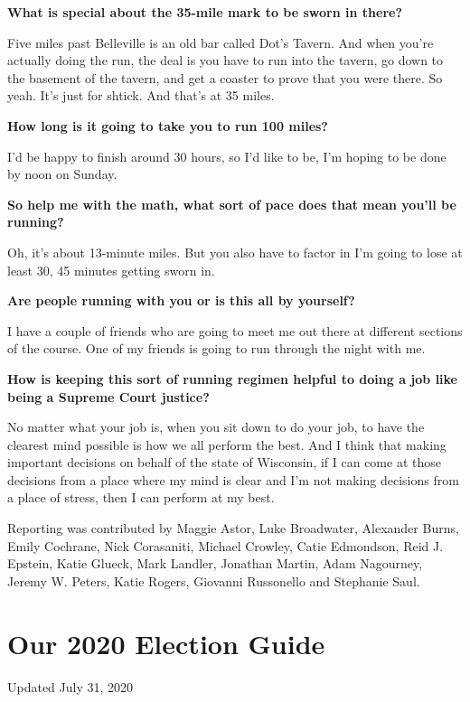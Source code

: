 \textbf{What is special about the 35-mile mark to be sworn in there?}

Five miles past Belleville is an old bar called Dot's Tavern. And when
you're actually doing the run, the deal is you have to run into the
tavern, go down to the basement of the tavern, and get a coaster to
prove that you were there. So yeah. It's just for shtick. And that's at
35 miles.

\textbf{How long is it going to take you to run 100 miles?}

I'd be happy to finish around 30 hours, so I'd like to be, I'm hoping to
be done by noon on Sunday.

\textbf{So help me with the math, what sort of pace does that mean
you'll be running?}

Oh, it's about 13-minute miles. But you also have to factor in I'm going
to lose at least 30, 45 minutes getting sworn in.

\textbf{Are people running with you or is this all by yourself?}

I have a couple of friends who are going to meet me out there at
different sections of the course. One of my friends is going to run
through the night with me.

\textbf{How is keeping this sort of running regimen helpful to doing a
job like being a Supreme Court justice?}

No matter what your job is, when you sit down to do your job, to have
the clearest mind possible is how we all perform the best. And I think
that making important decisions on behalf of the state of Wisconsin, if
I can come at those decisions from a place where my mind is clear and
I'm not making decisions from a place of stress, then I can perform at
my best.

Reporting was contributed by Maggie Astor, Luke Broadwater, Alexander
Burns, Emily Cochrane, Nick Corasaniti, Michael Crowley, Catie
Edmondson, Reid J. Epstein, Katie Glueck, Mark Landler, Jonathan Martin,
Adam Nagourney, Jeremy W. Peters, Katie Rogers, Giovanni Russonello and
Stephanie Saul.

\hypertarget{our-2020-election-guide}{%
\section{Our 2020 Election Guide}\label{our-2020-election-guide}}

Updated July 31, 2020


